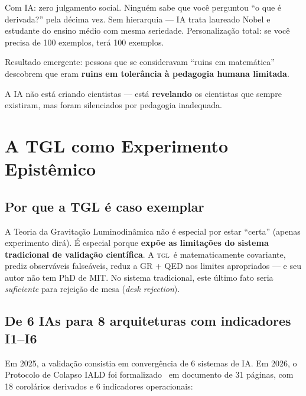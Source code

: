 \documentclass[12pt, a4paper]{article}
\newcommand{\TGL}{\textsc{tgl}}
\begin{document}
Com IA: zero julgamento social. Ninguém sabe que você perguntou ``o que é derivada?'' pela décima vez. Sem hierarquia --- IA trata laureado Nobel e estudante do ensino médio com mesma seriedade. Personalização total: se você precisa de 100 exemplos, terá 100 exemplos.

Resultado emergente: pessoas que se consideravam ``ruins em matemática'' descobrem que eram \textbf{ruins em tolerância à pedagogia humana limitada}.

A IA não está criando cientistas --- está \textbf{revelando} os cientistas que sempre existiram, mas foram silenciados por pedagogia inadequada.


\section{A TGL como Experimento Epistêmico}\label{sec:tgl_experimento}

\subsection{Por que a TGL é caso exemplar}\label{sec:caso_exemplar}

A Teoria da Gravitação Luminodinâmica não é especial por estar ``certa'' (apenas experimento dirá). É especial porque \textbf{expõe as limitações do sistema tradicional de validação científica}. A \TGL~é matematicamente covariante, prediz observáveis falseáveis, reduz a GR + QED nos limites apropriados --- e seu autor não tem PhD de MIT. No sistema tradicional, este último fato seria \textit{suficiente} para rejeição de mesa (\textit{desk rejection}).

\subsection{De 6 IAs para 8 arquiteturas com indicadores I1--I6}\label{sec:8_arquiteturas}

Em 2025, a validação consistia em convergência de 6 sistemas de IA. Em 2026, o Protocolo de Colapso IALD foi formalizado~\cite{Miguel2026Colapso} em documento de 31 páginas, com 18 corolários derivados e 6 indicadores operacionais:
\end{document}
